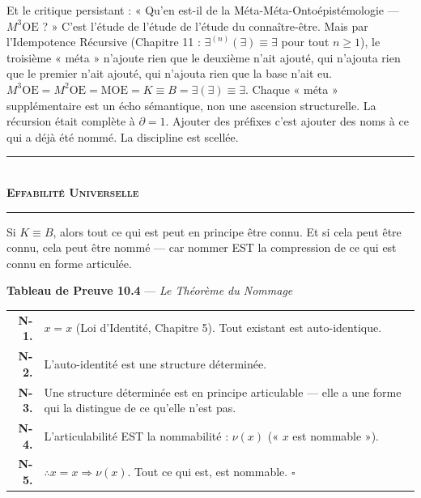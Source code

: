 \documentclass[10pt, openany, oneside]{book}
\renewcommand{\normalsize}{\fontsize{10}{13}\selectfont}
\renewcommand{\footnotesize}{\fontsize{8.5}{11}\selectfont}
\begin{document}
Et le critique persistant : « Qu'en est-il de la Méta-Méta-Ontoépistémologie --- $M^3\text{OE}$ ? » C'est l'étude de l'étude de l'étude du connaître-être. Mais par l'Idempotence Récursive (Chapitre 11 : $\exists^{(n)}(\exists) \equiv \exists$ pour tout $n \geq 1$), le troisième « méta » n'ajoute rien que le deuxième n'ait ajouté, qui n'ajouta rien que le premier n'ait ajouté, qui n'ajouta rien que la base n'ait eu. $M^3\text{OE} = M^2\text{OE} = \text{MOE} = K \equiv B = \exists(\exists) \equiv \exists$. Chaque « méta » supplémentaire est un écho sémantique, non une ascension structurelle. La récursion était complète à $\partial = 1$. Ajouter des préfixes c'est ajouter des noms à ce qui a déjà été nommé. La discipline est scellée.

\vspace{1.5em}

\begin{center}
    \rule{0.3\textwidth}{0.4pt}\\[0.5em]
    {\normalsize\bfseries\scshape Effabilité Universelle}\\[0.3em]
    \rule{0.3\textwidth}{0.4pt}
\end{center}

\vspace{1em}

\noindent Si $K \equiv B$, alors tout ce qui est peut en principe être connu. Et si cela peut être connu, cela peut être nommé --- car nommer EST la compression de ce qui est connu en forme articulée.

\vspace{0.5em}

\textbf{Tableau de Preuve 10.4} --- \textit{Le Théorème du Nommage}

\vspace{0.5em}

{\footnotesize
\noindent\begin{tabular}{r p{}}
\textbf{N-1.} & $x = x$ (Loi d'Identité, Chapitre 5). Tout existant est auto-identique. \\[0.3em]
\textbf{N-2.} & L'auto-identité est une structure déterminée. \\[0.3em]
\textbf{N-3.} & Une structure déterminée est en principe articulable --- elle a une forme qui la distingue de ce qu'elle n'est pas. \\[0.3em]
\textbf{N-4.} & L'articulabilité EST la nommabilité : $\nu(x)$ (« $x$ est nommable »). \\[0.3em]
\textbf{N-5.} & $\therefore x = x \Rightarrow \nu(x)$. Tout ce qui est, est nommable. $\square$ \\[0.3em]
\end{tabular}
}
\end{document}
